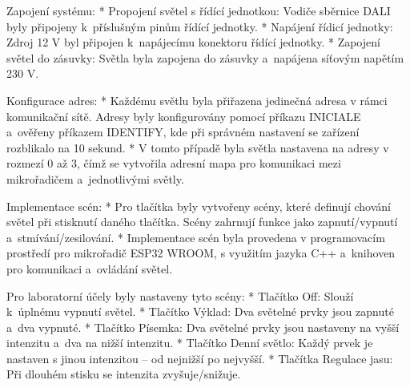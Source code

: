 \medskip\noindent
{\sbf Zapojení systému:}
\begitems
    * {\sbf Propojení světel s řídící jednotkou:} Vodiče sběrnice DALI byly připojeny k~příslušným pinům řídící jednotky.
    * {\sbf Napájení řídicí jednotky:} Zdroj 12 V byl připojen k~napájecímu konektoru řídící jednotky.
    * {\sbf Zapojení světel do zásuvky}: Světla byla zapojena do zásuvky a~napájena síťovým napětím 230 V.
\enditems

\medskip\noindent
{\sbf Konfigurace adres:}
\begitems
    * Každému světlu byla přiřazena jedinečná adresa v rámci komunikační sítě. Adresy
        byly konfigurovány pomocí příkazu INICIALE a~ověřeny příkazem IDENTIFY, kde při správném nastavení se zařízení rozblikalo na 10 sekund.
    * V tomto případě byla světla nastavena na adresy v rozmezí 0 až 3, čímž
        se vytvořila adresní mapa pro komunikaci mezi mikrořadičem a~jednotlivými světly.
\enditems


\medskip
\noindent
{\sbf Implementace scén:}
\begitems
    * Pro tlačítka byly vytvořeny scény, které definují chování světel při stisknutí daného tlačítka.
        Scény zahrnují funkce jako zapnutí/vypnutí a~stmívání/zesilování.
    * Implementace scén byla provedena v programovacím prostředí pro mikrořadič ESP32 WROOM,
        s využitím jazyka C++ a~knihoven pro komunikaci a~ovládání světel.
\enditems



\medskip
\noindent
{\sbf Pro laboratorní účely byly nastaveny tyto scény:}
\begitems
    * {\sbf Tlačítko Off:} Slouží k~úplnému vypnutí světel.
    * {\sbf Tlačítko Výklad:} Dva světelné prvky jsou zapnuté a~dva vypnuté.
    * {\sbf Tlačítko Písemka:} Dva světelné prvky jsou nastaveny na vyšší intenzitu a~dva na nižší intenzitu.
    * {\sbf Tlačítko Denní světlo:} Každý prvek je nastaven s jinou intenzitou -- od nejnižší po nejvyšší.
    * {\sbf Tlačítka Regulace jasu:} Při dlouhém stisku se intenzita zvyšuje/snižuje.
\enditems

